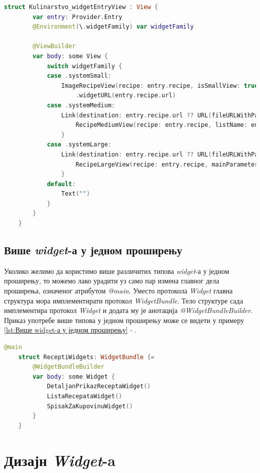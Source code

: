 \documentclass[12pt,oneside]{memoir}
\begin{document}
\begin{lstlisting}[caption=\textit{{Везе унутар widget-а}}, label={lst:Везе унутар widget-а}, language=Swift, frame=single]
    struct Kulinarstvo_widgetEntryView : View {
        var entry: Provider.Entry
        @Environment(\.widgetFamily) var widgetFamily
        
        @ViewBuilder
        var body: some View {
            switch widgetFamily {
            case .systemSmall:
                ImageRecipeView(recipe: entry.recipe, isSmallView: true)
                    .widgetURL(entry.recipe.url)
            case .systemMedium:
                Link(destination: entry.recipe.url ?? URL(fileURLWithPath: "")) {
                    RecipeMediumView(recipe: entry.recipe, listName: entry.parameterToShow)
                }
            case .systemLarge:
                Link(destination: entry.recipe.url ?? URL(fileURLWithPath: "")) {
                    RecipeLargeView(recipe: entry.recipe, mainParameter: entry.parameterToShow)
                }
            default:
                Text("")
            }
        }
    }
\end{lstlisting}

\subsection{Више \textit{widget}-а у једном проширењу}
\indent Уколико желимо да користимо више различитих типова \textit{widget}-а у једном проширењу, то можемо лако урадити уз само пар измена главног дела проширења, означеног атрибутом \textit{@main}. Уместо протокола \textit{Widget} главна структура мора имплементирати протокол \textit{WidgetBundle}. Тело структуре сада имплементира протокол \textit{Widget} и додата му је анотација \textit{@WidgetBundleBuilder}. Приказ употребе више типова у једном проширењу може се видети у примеру \ref{lst:Више widget-а у једном проширењу} - .

\begin{lstlisting}[caption=\textit{{Више widget-а у једном проширењу}}, label={lst:Више widget-а у једном проширењу}, language=Swift, frame=single]
    @main
    struct ReceptiWidgets: WidgetBundle {=
        @WidgetBundleBuilder
        var body: some Widget {
            DetaljanPrikazReceptaWidget()
            ListaRecepataWidget()
            SpisakZaKupovinuWidget()
        }
    }
\end{lstlisting}

\section{Дизајн \textit{Widget}-a}
\label{sec:Дизајн Widget-a}
\end{document}

